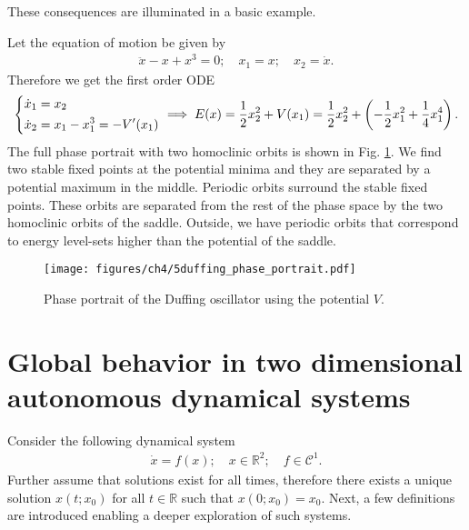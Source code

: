 These consequences are illuminated in a basic example.
\begin{ex}
Let the equation of motion be given by
\begin{align}
\ddot{x}-x+x^3=0;\quad x_1=x;\quad x_2=\dot{x}.	
\end{align}
Therefore we get the first order ODE
\begin{align}
	\begin{dcases}
		\dot{x}_1 = x_2 \\
		\dot{x}_2 = x_1 - x_1^3 = - V'(x_1)
	\end{dcases}
	\implies E(x) = \frac{1}{2}x_2^2+ V(x_1) = \frac{1}{2}x_2^2 + \left( - \frac{1}{2}x_1^2 + \frac{1}{4}x_1^4\right).	
\end{align}
The full phase portrait with two homoclinic orbits is shown in Fig. \ref{fig:duffing_phase_portrait}. 
We find two stable fixed points at the potential minima and they are separated by a potential maximum in the middle. Periodic orbits surround the stable fixed points. These orbits are separated from the rest of the phase space by the two homoclinic orbits of the saddle. Outside, we have periodic orbits that correspond to energy level-sets higher than the potential of the saddle. 


\begin{figure}[h!]
	\centering
	\texttt{[image: figures/ch4/5duffing\_phase\_portrait.pdf]}
	\caption{Phase portrait of the Duffing oscillator using the potential $V$.}
	\label{fig:duffing_phase_portrait}
\end{figure}

\end{ex}

\section{Global behavior in two dimensional autonomous dynamical systems}
Consider the following dynamical system
\begin{align}
	\dot{x} = f(x);\quad x \in \mathbb{R}^{2};\quad f \in \mathcal{C}^1.
\end{align}
Further assume that solutions exist for all times, therefore there exists a unique solution $x(t; x_0)$ for all $t \in \mathbb{R}$ such that $x(0;x_0)=x_0$. Next, a few definitions are introduced enabling a deeper exploration of such systems.

